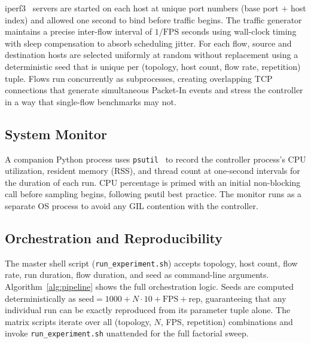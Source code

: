 \documentclass[conference]{IEEEtran}
\begin{document}
iperf3~\cite{iperf3} servers are started on each host at
unique port numbers (base port $+$ host index) and allowed
one second to bind before traffic begins. The traffic
generator maintains a precise inter-flow interval of
$1/\text{FPS}$ seconds using wall-clock timing with sleep
compensation to absorb scheduling jitter. For each flow,
source and destination hosts are selected uniformly at
random without replacement using a deterministic seed
that is unique per (topology, host count, flow rate,
repetition) tuple. Flows run concurrently as subprocesses,
creating overlapping TCP connections that generate simultaneous
Packet-In events and stress the controller in a way that
single-flow benchmarks may not.

\subsection{System Monitor}

A companion Python process uses \texttt{psutil}~\cite{psutil}
to record the controller process's CPU utilization, resident
memory (RSS), and thread count at one-second intervals for
the duration of each run. CPU percentage is primed with an
initial non-blocking call before sampling begins, following
psutil best practice. The monitor runs as a separate OS
process to avoid any GIL contention with the controller.

\subsection{Orchestration and Reproducibility}

The master shell script (\texttt{run\_experiment.sh}) accepts
topology, host count, flow rate, run duration, flow duration,
and seed as command-line arguments. Algorithm~\ref{alg:pipeline}
shows the full orchestration logic. Seeds are computed
deterministically as $\text{seed} = 1000 + N \cdot 10 +
\text{FPS} + \text{rep}$, guaranteeing that any individual
run can be exactly reproduced from its parameter tuple alone.
The matrix scripts iterate over all (topology, $N$, FPS,
repetition) combinations and invoke \texttt{run\_experiment.sh}
unattended for the full factorial sweep.
\end{document}

